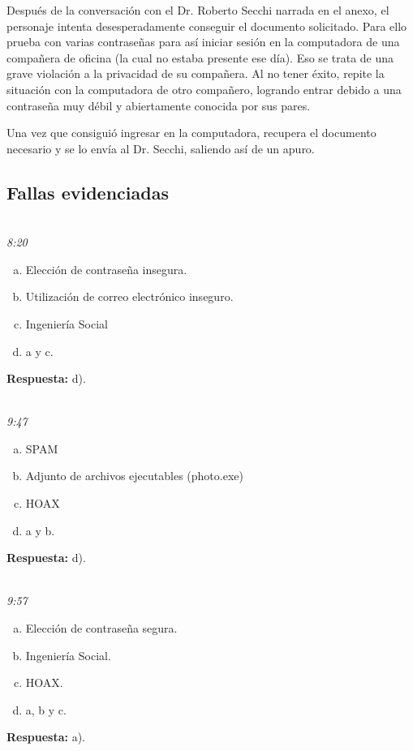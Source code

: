 Después de la conversación con el Dr. Roberto Secchi narrada en el anexo, el personaje intenta desesperadamente conseguir el documento solicitado. Para ello prueba con varias contraseñas para así iniciar sesión en la computadora de una compañera de oficina (la cual no estaba presente ese día). Eso se trata de una grave violación a la privacidad de su compañera. Al no tener éxito, repite la situación con la computadora de otro compañero, logrando entrar debido a una contraseña muy débil y abiertamente conocida por sus pares.

Una vez que consiguió ingresar en la computadora, recupera el documento necesario y se lo envía al Dr. Secchi, saliendo así de un apuro.

\subsection{Fallas evidenciadas}

~\\
\emph{8:20} 
\begin{enumerate}[a)]
    \item Elección de contraseña insegura.
    \item Utilización de correo electrónico inseguro.
    \item Ingeniería Social
    \item a y c.
\end{enumerate}

\textbf{Respuesta:} d). 

~\\
\emph{9:47} 
\begin{enumerate}[a)]
    \item SPAM
    \item Adjunto de archivos ejecutables (photo.exe)
    \item HOAX
    \item a y b.
\end{enumerate}

\textbf{Respuesta:} d). 

~\\
\emph{9:57} 
\begin{enumerate}[a)]
    \item Elección de contraseña segura.
    \item Ingeniería Social.
    \item HOAX.
    \item a, b y c.
\end{enumerate}

\textbf{Respuesta:} a). 

